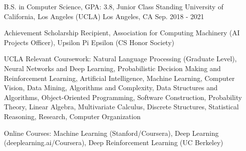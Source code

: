 

\begin{cventries}

\cventry
{B.S. in Computer Science, GPA: 3.8, Junior Class Standing} %
{University of California, Los Angeles (UCLA)} %
{Los Angeles, CA} %
{Sep. 2018 - 2021} %
{
  \begin{cvitems} %
    \item {Achievement Scholarship Recipient, Association for Computing Machinery
    (AI Projects Officer), Upsilon Pi Epsilon (CS Honor Society)}
    \item {UCLA Relevant Coursework: Natural Language Processing
    (Graduate Level), Neural Networks and Deep Learning, Probabilistic Decision Making and Reinforcement 
    Learning, Artificial Intelligence, Machine Learning, Computer Vision, Data Mining,
    Algorithms and Complexity, Data Structures and Algorithms, Object-Oriented 
    Programming, Software Construction, Probability Theory, Linear Algebra, 
    Multivariate Calculus, Discrete Structures, Statistical Reasoning, 
    Research, Computer Organization}
    \item {Online Courses: Machine Learning (Stanford/Coursera), Deep Learning (deeplearning.ai/Coursera), Deep Reinforcement Learning (UC Berkeley)}
  \end{cvitems}
}

\end{cventries}
